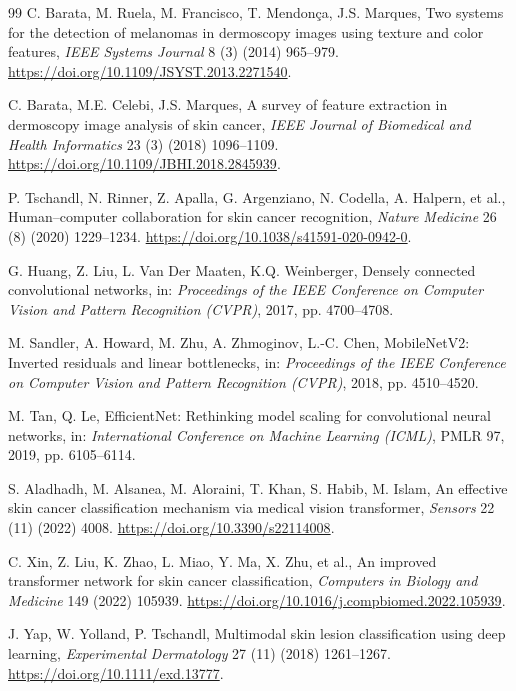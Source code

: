 \documentclass[11pt,a4paper]{article}
\begin{document}
\begin{thebibliography}{99}
C. Barata, M. Ruela, M. Francisco, T. Mendon{\c{c}}a, J.S. Marques, Two systems for the detection of melanomas in dermoscopy images using texture and color features, \textit{IEEE Systems Journal} 8 (3) (2014) 965--979. \url{https://doi.org/10.1109/JSYST.2013.2271540}.

C. Barata, M.E. Celebi, J.S. Marques, A survey of feature extraction in dermoscopy image analysis of skin cancer, \textit{IEEE Journal of Biomedical and Health Informatics} 23 (3) (2018) 1096--1109. \url{https://doi.org/10.1109/JBHI.2018.2845939}.

P. Tschandl, N. Rinner, Z. Apalla, G. Argenziano, N. Codella, A. Halpern, et al., Human--computer collaboration for skin cancer recognition, \textit{Nature Medicine} 26 (8) (2020) 1229--1234. \url{https://doi.org/10.1038/s41591-020-0942-0}.

G. Huang, Z. Liu, L. Van Der Maaten, K.Q. Weinberger, Densely connected convolutional networks, in: \textit{Proceedings of the IEEE Conference on Computer Vision and Pattern Recognition (CVPR)}, 2017, pp. 4700--4708.

M. Sandler, A. Howard, M. Zhu, A. Zhmoginov, L.-C. Chen, MobileNetV2: Inverted residuals and linear bottlenecks, in: \textit{Proceedings of the IEEE Conference on Computer Vision and Pattern Recognition (CVPR)}, 2018, pp. 4510--4520.

M. Tan, Q. Le, EfficientNet: Rethinking model scaling for convolutional neural networks, in: \textit{International Conference on Machine Learning (ICML)}, PMLR 97, 2019, pp. 6105--6114.

S. Aladhadh, M. Alsanea, M. Aloraini, T. Khan, S. Habib, M. Islam, An effective skin cancer classification mechanism via medical vision transformer, \textit{Sensors} 22 (11) (2022) 4008. \url{https://doi.org/10.3390/s22114008}.

C. Xin, Z. Liu, K. Zhao, L. Miao, Y. Ma, X. Zhu, et al., An improved transformer network for skin cancer classification, \textit{Computers in Biology and Medicine} 149 (2022) 105939. \url{https://doi.org/10.1016/j.compbiomed.2022.105939}.

J. Yap, W. Yolland, P. Tschandl, Multimodal skin lesion classification using deep learning, \textit{Experimental Dermatology} 27 (11) (2018) 1261--1267. \url{https://doi.org/10.1111/exd.13777}.


\end{thebibliography}
\end{document}
